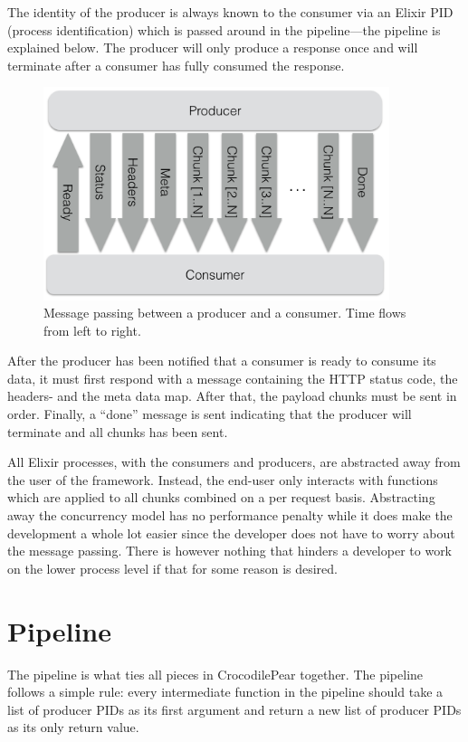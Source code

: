 \documentclass{cslthse-msc}
\begin{document}
The identity of the producer is always known to the consumer via an Elixir PID (process identification) which is passed around in the pipeline---the pipeline is explained below. The producer will only produce a response once and will terminate after a consumer has fully consumed the response.

\begin{figure}[H]
  \centering
    \begin{center}
      \includegraphics[width=0.9\textwidth]{images/crocpear_producer_consumer.png}
    \end{center}
  \caption{Message passing between a producer and a consumer. Time flows from left to right.}
\end{figure}

After the producer has been notified that a consumer is ready to consume its data, it must first respond with a message containing the HTTP status code, the headers- and the meta data map. After that, the payload chunks must be sent in order. Finally, a \enquote{done} message is sent indicating that the producer will terminate and all chunks has been sent.

All Elixir processes, with the consumers and producers, are abstracted away from the user of the framework. Instead, the end-user only interacts with functions which are applied to all chunks combined on a per request basis. Abstracting away the concurrency model has no performance penalty while it does make the development a whole lot easier since the developer does not have to worry about the message passing. There is however nothing that hinders a developer to work on the lower process level if that for some reason is desired.

\section{Pipeline}
The pipeline is what ties all pieces in CrocodilePear together. The pipeline follows a simple rule: every intermediate function in the pipeline should take a list of producer PIDs as its first argument and return a new list of producer PIDs as its only return value.
\end{document}
